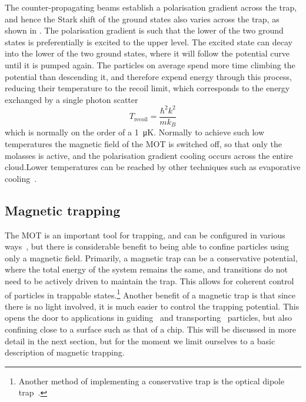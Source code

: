 The counter-propagating beams establish a polarisation gradient across the
trap, and hence the Stark shift of the ground states also varies across the
trap, as shown in . The polarisation
gradient is such that the lower of the two ground states is preferentially is
excited to the upper level.
%
The excited state can decay into the lower of the two ground states, where it
will follow the potential curve until it is pumped again. The particles on
average spend more time climbing the potential than descending it, and
therefore expend energy through this process, reducing their temperature to the
recoil limit, which corresponds to the energy exchanged by a single photon
scatter
%
\begin{equation}
  T_\text{recoil} = \frac{\hbar^2 k^2}{m k_B}
\end{equation}
%
which is normally on the order of a \SI{1}{\micro\kelvin}.  Normally to achieve
such low temperatures the magnetic field of the MOT is switched off, so that
only the molasses is active, and the polarisation gradient cooling occurs
across the entire cloud.Lower temperatures can be reached by other techniques
such as evaporative cooling~\cite{Metcalf1999}.

\subsection{Magnetic trapping}
\label{theory:magtraps}

The MOT is an important tool for trapping, and can be configured in various
ways~\cite{Cotter2016, Lee:96, PhysRevLett.59.2631}, but there is considerable
benefit to being able to confine particles using only a magnetic field.
%
Primarily, a magnetic trap can be a conservative potential, where the total
energy of the system remains the same, and transitions do not need to be
actively driven to maintain the trap. This allows for coherent control of
particles in trappable states.\footnote{Another method of implementing a
  conservative trap is the optical dipole trap~\cite{Foot2005}.}
%
Another benefit of a magnetic trap is that since there is no light involved, it
is much easier to control the trapping potential. This opens the door to
applications in guiding~\cite{PhysRevLett.83.5194} and
transporting~\cite{Nakagawa2005} particles, but also confining close to a
surface such as that of a chip. This will be discussed in more detail in the
next section, but for the moment we limit ourselves to a basic description of
magnetic trapping.

